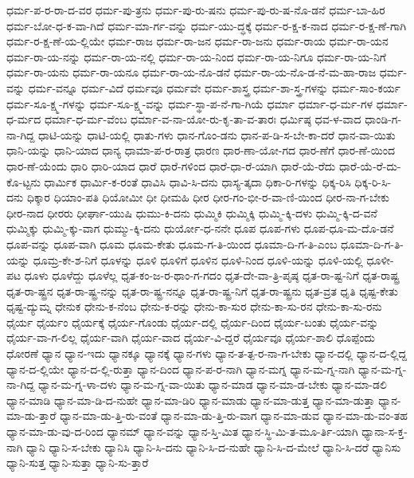 {ಧರ್ಮ-ಪ-ರ-ರಾ-ದ-ವರ
ಧರ್ಮ-ಪು-ತ್ರನು
ಧರ್ಮ-ಪು-ರು-ಷನು
ಧರ್ಮ-ಪು-ರು-ಷ-ನೊ-ಡನೆ
ಧರ್ಮ-ಬಾ-ಹಿರ
ಧರ್ಮ-ಬೋ-ಧ-ಕ-ವಾ-ಗಿದೆ
ಧರ್ಮ-ಮಾ-ರ್ಗ-ವನ್ನು
ಧರ್ಮ-ಯು-ದ್ಧಕ್ಕೆ
ಧರ್ಮ-ರ-ಕ್ಷ-ಕ-ನಾದ
ಧರ್ಮ-ರ-ಕ್ಷ-ಣೆ-ಗಾಗಿ
ಧರ್ಮ-ರ-ಕ್ಷ-ಣೆ-ಯ-ಲ್ಲಿಯೇ
ಧರ್ಮ-ರಾಜ
ಧರ್ಮ-ರಾ-ಜನ
ಧರ್ಮ-ರಾ-ಜನು
ಧರ್ಮ-ರಾಯ
ಧರ್ಮ-ರಾ-ಯನ
ಧರ್ಮ-ರಾ-ಯ-ನನ್ನು
ಧರ್ಮ-ರಾ-ಯ-ನಲ್ಲಿ
ಧರ್ಮ-ರಾ-ಯ-ನಿಂದ
ಧರ್ಮ-ರಾ-ಯ-ನಿಗೂ
ಧರ್ಮ-ರಾ-ಯ-ನಿಗೆ
ಧರ್ಮ-ರಾ-ಯನು
ಧರ್ಮ-ರಾ-ಯನೂ
ಧರ್ಮ-ರಾ-ಯ-ನೊ-ಡನೆ
ಧರ್ಮ-ರಾ-ಯ-ನೊ-ಡ-ನೆ-ಮ-ಹಾ-ರಾಜ
ಧರ್ಮ-ವನ್ನು
ಧರ್ಮ-ವನ್ನೂ
ಧರ್ಮ-ವಿದೆ
ಧರ್ಮವೂ
ಧರ್ಮವೇ
ಧರ್ಮ-ಶಾಸ್ತ್ರ
ಧರ್ಮ-ಶಾ-ಸ್ತ್ರ-ಗಳನ್ನು
ಧರ್ಮ-ಸಾಂ-ಕರ್ಯ
ಧರ್ಮ-ಸೂ-ಕ್ಷ್ಮ-ಗಳನ್ನು
ಧರ್ಮ-ಸೂ-ಕ್ಷ್ಮ-ವನ್ನು
ಧರ್ಮ-ಸ್ಥಾ-ಪ-ನೆ-ಗಾ-ಗಿಯೆ
ಧರ್ಮಾ
ಧರ್ಮಾ-ಧ-ರ್ಮ-ಗಳ
ಧರ್ಮಾ-ಧ-ರ್ಮದ
ಧರ್ಮಾ-ಧ-ರ್ಮ-ವೆಂಬ
ಧರ್ಮಾ-ವ-ನಾ-ಯೋ-ರು-ಕೃ-ತಾ-ವ-ತಾರಃ
ಧರ್ಮಿಷ್ಠ
ಧವ-ಳ-ವಾದ
ಧಾಂಡಿ-ಗ-ನಾ-ಗಿದ್ದ
ಧಾಟಿ-ಯನ್ನು
ಧಾಟಿ-ಯಲ್ಲಿ
ಧಾತು-ಗಳು
ಧಾನ-ಗೊಂ-ಡನು
ಧಾನ-ಪ-ಡಿ-ಸ-ಬೇ-ಕಾ-ದರೆ
ಧಾನ-ವಾ-ಯಿತು
ಧಾನಿ-ಯನ್ನು
ಧಾನಿ-ಯಾದ
ಧಾನ್ಯ
ಧಾಮಾ-ಪ-ರ-ರಾತ್ರ
ಧಾರಣ
ಧಾರ-ಣಾ-ಯೋ-ಗದ
ಧಾರ-ಣೆಗೆ
ಧಾರ-ಣೆ-ಯಿಂದ
ಧಾರ-ಣೆ-ಯೆಂದು
ಧಾರಿ
ಧಾರಿ-ಯಾದ
ಧಾರೆ
ಧಾರೆ-ಗಳಿಂದ
ಧಾರೆ-ಧಾ-ರೆ-ಯಾಗಿ
ಧಾರೆ-ಯೆ-ರೆದು
ಧಾರೆ-ಯೆ-ರೆ-ದು-ಕೊ-ಟ್ಟನು
ಧಾರ್ಮಿಕ
ಧಾರ್ಮಿ-ಕ-ರಂತೆ
ಧಾವಿಸಿ
ಧಾವಿ-ಸಿ-ದನು
ಧಾಸ್ಯ-ತ್ಕದಾ
ಧಿಕಾ-ರಿ-ಗಳನ್ನು
ಧಿಕ್ಕ-ರಿಸಿ
ಧಿಕ್ಕ-ರಿ-ಸಿ-ದನು
ಧಿಕ್ಕಾರ
ಧಿಯಾಂ-ಪತಿ
ಧಿಯೋಮೀ
ಧೀ
ಧೀಮಹಿ
ಧೀರ
ಧೀರ-ಗಂ-ಭೀ-ರ-ವಾ-ಣಿ-ಯಿಂದ
ಧೀರ-ನಾ-ಗ-ಬೇಕು
ಧೀರ-ನಾದ
ಧೀರರು
ಧೀರ್ಘಾ-ಯುಷಿ
ಧುಮು-ಕಿ-ದನು
ಧುಮ್ಮಿಕಿ
ಧುಮ್ಮಿಕ್ಕಿ
ಧುಮ್ಮಿ-ಕ್ಕಿ-ದಳು
ಧುಮ್ಮಿ-ಕ್ಕಿ-ದ-ವನೆ
ಧುಮ್ಮಿಕ್ಕು
ಧುಮ್ಮಿ-ಕ್ಕು-ವಾಗ
ಧುಮ್ಮು-ಕ್ಕಿ-ದನು
ಧುರ್ಯೋ-ಧ-ನನೇ
ಧೂಪ
ಧೂಪ-ಗಳು
ಧೂಪ-ಧೂ-ಮ-ದೊ-ಡನೆ
ಧೂಪ-ವನ್ನು
ಧೂಪ-ವಾಗಿ
ಧೂಮ
ಧೂಮ-ಕೇತು
ಧೂಮ-ಗ-ತಿ-ಯಿಂದ
ಧೂಮಾ-ದಿ-ಗ-ತಿ-ಎಂಬ
ಧೂಮಾ-ದಿ-ಗ-ತಿ-ಯನ್ನು
ಧೂಮ್ರ-ಕೇ-ಶ-ನಿಗೆ
ಧೂಳನ್ನು
ಧೂಳಿ
ಧೂಳಿಗೆ
ಧೂಳಿನ
ಧೂಳಿ-ನಿಂದ
ಧೂಳಿ-ಯನ್ನು
ಧೂಳಿ-ಯಲ್ಲಿ
ಧೂಳೀ-ಪಟ
ಧೂಳು
ಧೂಳೆದ್ದು
ಧೂಳೆಲ್ಲ
ಧೃತ-ಕಂ-ಜ-ರ-ಥಾಂ-ಗ-ಗದಂ
ಧೃತ-ದೇ-ವಾ-ತ್ರಿ-ಪೃಷ್ಠ
ಧೃತ-ರಾ-ಷ್ಟ-ನಿಗೆ
ಧೃತ-ರಾಷ್ಟ್ರ
ಧೃತ-ರಾ-ಷ್ಟ್ರನ
ಧೃತ-ರಾ-ಷ್ಟ್ರ-ನನ್ನು
ಧೃತ-ರಾ-ಷ್ಟ್ರ-ನನ್ನೂ
ಧೃತ-ರಾ-ಷ್ಟ್ರ-ನಿಗೆ
ಧೃತ-ರಾ-ಷ್ಟ್ರನು
ಧೃತ-ವ್ರತ
ಧೃತಿ
ಧೃಷ್ಟ-ಕೇತು
ಧೃಷ್ಟ-ದ್ಯುಮ್ನ
ಧೇನುಕ
ಧೇನು-ಕ-ನೆಂಬ
ಧೇನು-ಕ-ರನ್ನು
ಧೇನು-ಕಾ-ಸುರ
ಧೇನು-ಕಾ-ಸು-ರನ
ಧೇನು-ಕಾ-ಸು-ರನು
ಧೈರ್ಯ
ಧೈರ್ಯಂ
ಧೈರ್ಯಕ್ಕೆ
ಧೈರ್ಯ-ಗೊಂಡು
ಧೈರ್ಯ-ದಲ್ಲಿ
ಧೈರ್ಯ-ದಿಂದ
ಧೈರ್ಯ-ಬಂತು
ಧೈರ್ಯ-ವನ್ನು
ಧೈರ್ಯ-ವಾ-ಗ-ಲಿಲ್ಲ
ಧೈರ್ಯ-ವಾಗಿ
ಧೈರ್ಯ-ವಾದ
ಧೈರ್ಯ-ವಿ-ದ್ದರೆ
ಧೈರ್ಯವೂ
ಧೈರ್ಯ-ಶಾಲಿ
ಧೊಪ್ಪೆಂದು
ಧೋರಣೆ
ಧ್ಯಾನ
ಧ್ಯಾನ-ಇದು
ಧ್ಯಾನಕ್ಕೂ
ಧ್ಯಾನಕ್ಕೆ
ಧ್ಯಾನ-ಗಳು
ಧ್ಯಾನ-ತ-ತ್ಪ-ರ-ನಾ-ಗ-ಬೇಕು
ಧ್ಯಾನ-ದಲ್ಲಿ
ಧ್ಯಾನ-ದ-ಲ್ಲಿದ್ದ
ಧ್ಯಾನ-ದ-ಲ್ಲಿಯೇ
ಧ್ಯಾನ-ದ-ಲ್ಲಿ-ರುತ್ತಾ
ಧ್ಯಾನ-ದಿಂದ
ಧ್ಯಾನ-ಪ-ರ-ನಾಗಿ
ಧ್ಯಾನ-ಮಗ್ನ
ಧ್ಯಾನ-ಮ-ಗ್ನ-ನಾಗಿ
ಧ್ಯಾನ-ಮ-ಗ್ನ-ನಾ-ಗಿದ್ದ
ಧ್ಯಾನ-ಮ-ಗ್ನ-ಳಾ-ದಳು
ಧ್ಯಾನ-ಮ-ಗ್ನ-ವಾ-ಯಿತು
ಧ್ಯಾನ-ಮಾಡ
ಧ್ಯಾನ-ಮಾ-ಡ-ಬೇಕು
ಧ್ಯಾನ-ಮಾ-ಡಲಿ
ಧ್ಯಾನ-ಮಾಡಿ
ಧ್ಯಾನ-ಮಾ-ಡಿ-ದ-ನುಹೇ
ಧ್ಯಾನ-ಮಾ-ಡಿರಿ
ಧ್ಯಾನ-ಮಾಡು
ಧ್ಯಾನ-ಮಾ-ಡುತ್ತ
ಧ್ಯಾನ-ಮಾ-ಡುತ್ತಾ
ಧ್ಯಾನ-ಮಾ-ಡು-ತ್ತಾರೆ
ಧ್ಯಾನ-ಮಾ-ಡು-ತ್ತಿ-ರು-ವಂತೆ
ಧ್ಯಾನ-ಮಾ-ಡು-ತ್ತಿ-ರು-ವಾಗ
ಧ್ಯಾನ-ಮಾ-ಡುವ
ಧ್ಯಾನ-ಮಾ-ಡು-ವಂ-ತಹ
ಧ್ಯಾನ-ಮಾ-ಡು-ವು-ದ-ರಿಂದ
ಧ್ಯಾನಮ್
ಧ್ಯಾನ-ವನ್ನು
ಧ್ಯಾನ-ಸ್ತಿ-ಮಿತ
ಧ್ಯಾನ-ಸ್ಥಿ-ಮಿ-ತ-ಮೂ-ರ್ತಿ-ಯಾಗಿ
ಧ್ಯಾನಾ-ಸ-ಕ್ತ-ನಾಗಿ
ಧ್ಯಾನಿ
ಧ್ಯಾನಿ-ಸ-ಬೇಕು
ಧ್ಯಾನಿಸಿ
ಧ್ಯಾನಿ-ಸಿ-ದನು
ಧ್ಯಾನಿ-ಸಿ-ದ-ನುಹೇ
ಧ್ಯಾನಿ-ಸಿ-ದ-ಮೇಲೆ
ಧ್ಯಾನಿ-ಸಿ-ದರೆ
ಧ್ಯಾನಿಸು
ಧ್ಯಾನಿ-ಸುತ್ತ
ಧ್ಯಾನಿ-ಸುತ್ತಾ
ಧ್ಯಾನಿ-ಸು-ತ್ತಾರೆ
}
